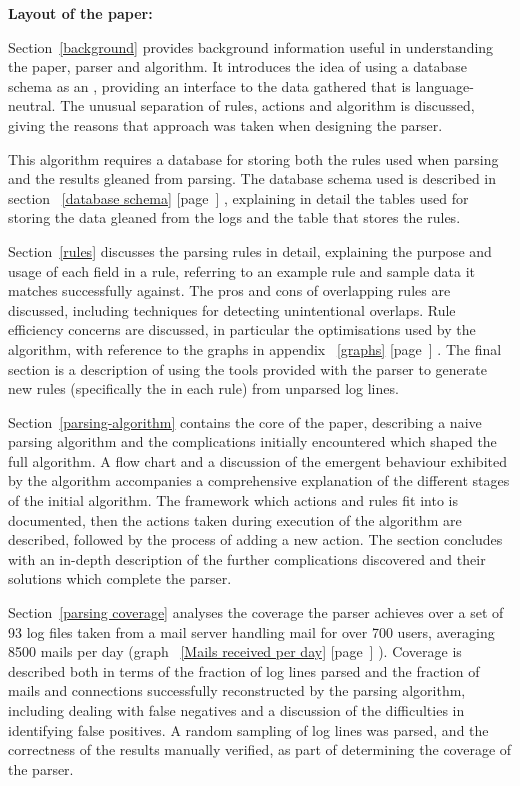 \documentclass[a4paper,12pt,draft]{article}
\newcommand{\refwithpage}[1]{%
    \empty{}\ref{#1} [page~\pageref{#1}]%
}
\newcommand{\numberOFlogFILES}[0]{%
    93%
}
\begin{document}
\vspace{1em}\noindent\textbf{Layout of the paper:}

Section~\ref{background} provides background information useful in
understanding the paper, parser and algorithm.  It introduces the idea of
using a database schema as an \API{}, providing an interface to the data
gathered that is language-neutral.  The unusual separation of rules,
actions and algorithm is discussed, giving the reasons that approach was
taken when designing the parser.

This algorithm requires a database for storing both the rules used when
parsing and the results gleaned from parsing.  The database schema used is
described in section~\refwithpage{database schema}, explaining in detail
the tables used for storing the data gleaned from the logs and the table
that stores the rules.

Section~\ref{rules} discusses the parsing rules in detail, explaining the
purpose and usage of each field in a rule, referring to an example rule and
sample data it matches successfully against.  The pros and cons of
overlapping rules are discussed, including techniques for detecting
unintentional overlaps.  Rule efficiency concerns are discussed, in
particular the optimisations used by the algorithm, with reference to the
graphs in appendix~\refwithpage{graphs}.  The final section is a
description of using the tools provided with the parser to generate new
rules (specifically the \regex{} in each rule) from unparsed log lines.

Section~\ref{parsing-algorithm} contains the core of the paper, describing
a naive parsing algorithm and the complications initially encountered which
shaped the full algorithm.  A flow chart and a discussion of the emergent
behaviour exhibited by the algorithm accompanies a comprehensive
explanation of the different stages of the initial algorithm.  The
framework which actions and rules fit into is documented, then the actions
taken during execution of the algorithm are described, followed by the
process of adding a new action.  The section concludes with an in-depth
description of the further complications discovered and their solutions
which complete the parser.

Section~\ref{parsing coverage} analyses the coverage the parser achieves
over a set of \numberOFlogFILES{} log files taken from a mail server
handling mail for over 700 users, averaging 8500 mails per day
(graph~\refwithpage{Mails received per day}).  Coverage is described both
in terms of the fraction of log lines parsed and the fraction of mails and
connections successfully reconstructed by the parsing algorithm, including
dealing with false negatives and a discussion of the difficulties in
identifying false positives.  A random sampling of log lines was parsed,
and the correctness of the results manually verified, as part of
determining the coverage of the parser.
\end{document}
